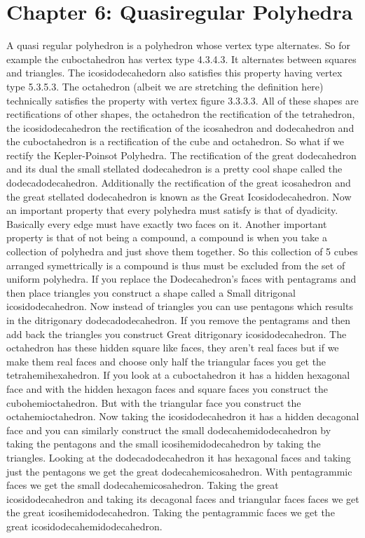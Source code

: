 \documentclass{article}
\begin{document}
\section*{Chapter 6: Quasiregular Polyhedra}
A quasi regular polyhedron is a polyhedron whose vertex type alternates. So for example the cuboctahedron has vertex type 4.3.4.3. It alternates between squares and triangles. The icosidodecahedorn also satisfies this property having vertex type 5.3.5.3. The octahedron (albeit we are stretching the definition here) technically satisfies the property with vertex figure 3.3.3.3. All of these shapes are rectifications of other shapes, the octahedron the rectification of the tetrahedron, the icosidodecahedron the rectification of the icosahedron and dodecahedron and the cuboctahedron is a rectification of the cube and octahedron. So what if we rectify the Kepler-Poinsot Polyhedra. The rectification of the great dodecahedron and its dual the small stellated dodecahedron is a pretty cool shape called the dodecadodecahedron. Additionally the rectification of the great icosahedron and the great stellated dodecahedron is known as the Great Icosidodecahedron. Now an important property that every polyhedra must satisfy is that of dyadicity. Basically every edge must have exactly two faces on it. Another important property is that of not being a compound, a compound is when you take a collection of polyhedra and just shove them together. So this collection of 5 cubes arranged symettrically is a compound is thus must be excluded from the set of uniform polyhedra. If you replace the Dodecahedron's faces with pentagrams and then place triangles you construct a shape called a Small ditrigonal icosidodecahedron. Now instead of triangles you can use pentagons which results in the ditrigonary dodecadodecahedron. If you remove the pentagrams and then add back the triangles you construct Great ditrigonary icosidodecahedron. The octahedron has these hidden square like faces, they aren't real faces but if we make them real faces and choose only half the triangular faces you get the tetrahemihexahedron. If you look at a cuboctahedron it has a hidden hexagonal face and with the hidden hexagon faces and square faces you construct the cubohemioctahedron. But with the triangular face you construct the octahemioctahedron. Now taking the icosidodecahedron it has a hidden decagonal face and you can similarly construct the small dodecahemidodecahedron by taking the pentagons and the small icosihemidodecahedron by taking the triangles. Looking at the dodecadodecahedron it has hexagonal faces and taking just the pentagons we get the great dodecahemicosahedron. With pentagrammic faces we get the small dodecahemicosahedron. Taking the great icosidodecahedron and taking its decagonal faces and triangular faces faces we get the great icosihemidodecahedron. Taking the pentagrammic faces we get the great icosidodecahemidodecahedron.
\end{document}
